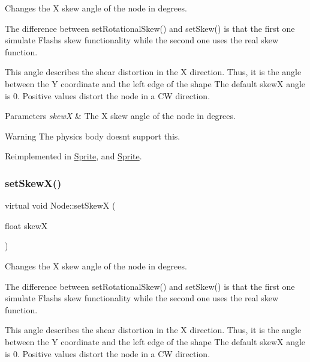 Changes the X skew angle of the node in degrees.

The difference between {\ttfamily set\+Rotational\+Skew()} and {\ttfamily set\+Skew()} is that the first one simulate Flash\textquotesingle{}s skew functionality while the second one uses the real skew function.

This angle describes the shear distortion in the X direction. Thus, it is the angle between the Y coordinate and the left edge of the shape The default skewX angle is 0. Positive values distort the node in a CW direction.


\begin{DoxyParams}{Parameters}
{\em skewX} & The X skew angle of the node in degrees.\\
\hline
\end{DoxyParams}
\begin{DoxyWarning}{Warning}
The physics body doesn\textquotesingle{}t support this. 
\end{DoxyWarning}


Reimplemented in \hyperlink{classSprite_a975b779e48841943ebbe5147331fc8c2}{Sprite}, and \hyperlink{classSprite_ae6ad4d3c0f8be8d4ac45a0c1f8012896}{Sprite}.

\mbox{\label{classNode_a237a875e4c96d5ef4286d8fa31062047}} 
\subsubsection{\texorpdfstring{set\+Skew\+X()}{setSkewX()}\hspace{0.1cm}{\footnotesize\ttfamily [2/2]}}
{\footnotesize\ttfamily virtual void Node\+::set\+SkewX (\begin{DoxyParamCaption}\item[{float}]{skewX }\end{DoxyParamCaption})\hspace{0.3cm}{\ttfamily [virtual]}}

Changes the X skew angle of the node in degrees.

The difference between {\ttfamily set\+Rotational\+Skew()} and {\ttfamily set\+Skew()} is that the first one simulate Flash\textquotesingle{}s skew functionality while the second one uses the real skew function.

This angle describes the shear distortion in the X direction. Thus, it is the angle between the Y coordinate and the left edge of the shape The default skewX angle is 0. Positive values distort the node in a CW direction.


